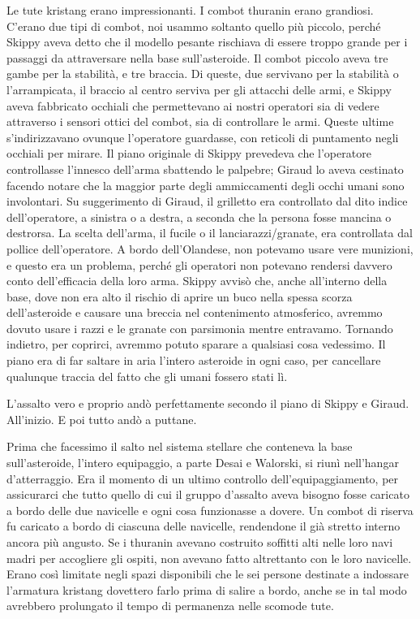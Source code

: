Le tute kristang erano impressionanti. I combot thuranin erano
grandiosi. C'erano due tipi di combot, noi usammo soltanto quello più
piccolo, perché Skippy aveva detto che il modello pesante rischiava di
essere troppo grande per i passaggi da attraversare nella base
sull'asteroide. Il combot piccolo aveva tre gambe per la stabilità, e
tre braccia. Di queste, due servivano per la stabilità o l'arrampicata,
il braccio al centro serviva per gli attacchi delle armi, e Skippy aveva
fabbricato occhiali che permettevano ai nostri operatori sia di vedere
attraverso i sensori ottici del combot, sia di controllare le armi.
Queste ultime s'indirizzavano ovunque l'operatore guardasse, con
reticoli di puntamento negli occhiali per mirare. Il piano originale di
Skippy prevedeva che l'operatore controllasse l'innesco dell'arma
sbattendo le palpebre; Giraud lo aveva cestinato facendo notare che la
maggior parte degli ammiccamenti degli occhi umani sono involontari. Su
suggerimento di Giraud, il grilletto era controllato dal dito indice
dell'operatore, a sinistra o a destra, a seconda che la persona fosse
mancina o destrorsa. La scelta dell'arma, il fucile o il
lanciarazzi/granate, era controllata dal pollice dell'operatore. A bordo
dell'Olandese, non potevamo usare vere munizioni, e questo era un
problema, perché gli operatori non potevano rendersi davvero conto
dell'efficacia della loro arma. Skippy avvisò che, anche all'interno
della base, dove non era alto il rischio di aprire un buco nella spessa
scorza dell'asteroide e causare una breccia nel contenimento
atmosferico, avremmo dovuto usare i razzi e le granate con parsimonia
mentre entravamo. Tornando indietro, per coprirci, avremmo potuto
sparare a qualsiasi cosa vedessimo. Il piano era di far saltare in aria
l'intero asteroide in ogni caso, per cancellare qualunque traccia del
fatto che gli umani fossero stati lì.

\hfill\break

L'assalto vero e proprio andò perfettamente secondo il piano di Skippy e
Giraud. All'inizio. E poi tutto andò a puttane.

Prima che facessimo il salto nel sistema stellare che conteneva la base
sull'asteroide, l'intero equipaggio, a parte Desai e Walorski, si riunì
nell'hangar d'atterraggio. Era il momento di un ultimo controllo
dell'equipaggiamento, per assicurarci che tutto quello di cui il gruppo
d'assalto aveva bisogno fosse caricato a bordo delle due navicelle e
ogni cosa funzionasse a dovere. Un combot di riserva fu caricato a bordo
di ciascuna delle navicelle, rendendone il già stretto interno ancora
più angusto. Se i thuranin avevano costruito soffitti alti nelle loro
navi madri per accogliere gli ospiti, non avevano fatto altrettanto con
le loro navicelle. Erano così limitate negli spazi disponibili che le
sei persone destinate a indossare l'armatura kristang dovettero farlo
prima di salire a bordo, anche se in tal modo avrebbero prolungato il
tempo di permanenza nelle scomode tute.

